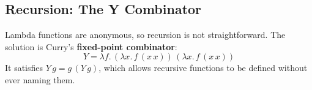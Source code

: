 \subsection{Recursion: The Y Combinator}

Lambda functions are anonymous, so recursion is not straightforward.
The solution is Curry's \textbf{fixed-point combinator}:
\[
  Y = \lambda f.\,(\lambda x.\, f\,(x\, x))\,(\lambda x.\, f\,(x\, x))
\]
It satisfies $Y\, g = g\,(Y\, g)$, which allows recursive functions to be
defined without ever naming them.